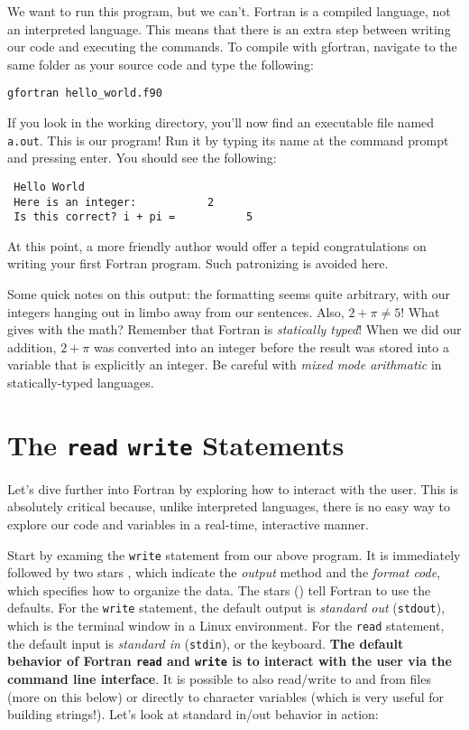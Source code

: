 \documentclass[11pt, letterpaper]{article}
\begin{document}
We want to run this program, but we can't.  Fortran is a compiled language,
not an interpreted language.  This means that there is an extra step between
writing our code and executing the commands.  To compile with gfortran,
navigate to the same folder as your source code and type the following:
\begin{verbatim}
gfortran hello_world.f90
\end{verbatim}

If you look in the working directory, you'll now find an executable file
named \texttt{a.out}.  This is our program!  Run it by typing its name at the
command prompt and pressing enter.  You should see the following:

\begin{verbatim}
 Hello World
 Here is an integer:           2
 Is this correct? i + pi =           5
\end{verbatim}


At this point, a more friendly author would offer a tepid congratulations on
writing your first Fortran program.  Such patronizing is avoided here.

Some quick notes on this output: the formatting seems quite arbitrary, with our
integers hanging out in limbo away from our sentences.  Also, $2+\pi \neq 5$!
What gives with the math?  Remember that Fortran is \emph{statically typed}!  When
we did our addition, $2+\pi$ was converted into an integer before the result was
stored into a variable that is explicitly an integer.  Be careful with
\emph{mixed mode arithmatic} in statically-typed languages.

\section{The \texttt{read} \texttt{write} Statements}

Let's dive further into Fortran by exploring how to interact with the user.
This is absolutely critical because, unlike interpreted languages, there is
no easy way to explore our code and variables in a real-time, interactive
manner.

Start by examing the \texttt{write} statement from our above program.
It is immediately followed by two stars {\tt *}, which indicate the \emph{output}
method and the \emph{format code}, which specifies how to organize the
data.  The stars ({\tt *}) tell Fortran to use the defaults.  For the {\tt write}
statement, the default output is \emph{standard out} ({\tt stdout}), which is
the terminal window in a Linux environment.  For the {\tt read} statement, the
default input is \emph{standard in} ({\tt stdin}), or the keyboard.
\textbf{The default behavior of Fortran {\tt read} and {\tt write} is to interact
  with the user via the command line interface}.
It is possible to also read/write to and from files (more on this below) or
directly to character variables (which is very useful for building strings!).
Let's look at standard in/out behavior in action:
\end{document}
